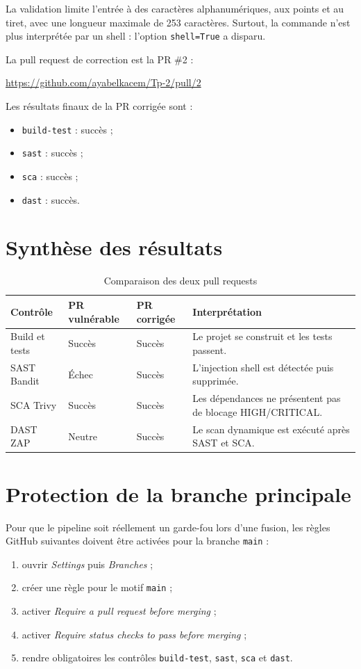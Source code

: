 \documentclass[12pt,a4paper]{article}
\begin{document}
La validation limite l'entrée à des caractères alphanumériques, aux points et au
tiret, avec une longueur maximale de 253 caractères. Surtout, la commande n'est plus
interprétée par un shell : l'option \texttt{shell=True} a disparu.

La pull request de correction est la PR \#2 :
\begin{center}
\url{https://github.com/ayabelkacem/Tp-2/pull/2}
\end{center}

Les résultats finaux de la PR corrigée sont :
\begin{itemize}
  \item \texttt{build-test} : succès ;
  \item \texttt{sast} : succès ;
  \item \texttt{sca} : succès ;
  \item \texttt{dast} : succès.
\end{itemize}

\section{Synthèse des résultats}

\begin{table}[H]
\centering
\begin{tabular}{p{3cm}p{3.1cm}p{3.1cm}p{4.2cm}}
\toprule
\textbf{Contrôle} & \textbf{PR vulnérable} & \textbf{PR corrigée} & \textbf{Interprétation} \\
\midrule
Build et tests & Succès & Succès & Le projet se construit et les tests passent. \\
SAST Bandit & Échec & Succès & L'injection shell est détectée puis supprimée. \\
SCA Trivy & Succès & Succès & Les dépendances ne présentent pas de blocage HIGH/CRITICAL. \\
DAST ZAP & Neutre & Succès & Le scan dynamique est exécuté après SAST et SCA. \\
\bottomrule
\end{tabular}
\caption{Comparaison des deux pull requests}
\end{table}

\section{Protection de la branche principale}

Pour que le pipeline soit réellement un garde-fou lors d'une fusion, les règles GitHub
suivantes doivent être activées pour la branche \texttt{main} :
\begin{enumerate}
  \item ouvrir \textit{Settings} puis \textit{Branches} ;
  \item créer une règle pour le motif \texttt{main} ;
  \item activer \textit{Require a pull request before merging} ;
  \item activer \textit{Require status checks to pass before merging} ;
  \item rendre obligatoires les contrôles \texttt{build-test}, \texttt{sast},
        \texttt{sca} et \texttt{dast}.
\end{enumerate}
\end{document}
